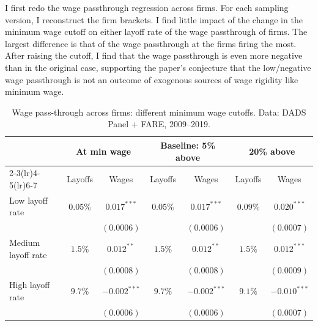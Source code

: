 I first redo the wage passthrough regression across firms. For each sampling version, I reconstruct the firm brackets. I find little impact of the change in the minimum wage cutoff on either layoff rate of the wage passthrough of firms. The largest difference is that of the wage passthrough at the firms firing the most. After raising the cutoff, I find that the wage passthrough is even more negative than in the original case, supporting the paper's conjecture that the low/negative wage passthrough is not an outcome of exogenous sources of wage rigidity like minimum wage.
\begin{table}[h!]
  \centering
  \begin{tabular}{lcccccc}
    \toprule
    & \multicolumn{2}{c}{At min wage} & \multicolumn{2}{c}{Baseline: 5\% above} & \multicolumn{2}{c}{20\% above}\\
    \cmidrule(lr){2-3}\cmidrule(lr){4-5}\cmidrule(lr){6-7}
    & Layoffs & Wages & Layoffs & Wages & Layoffs & Wages \\
    \midrule
    \hline
    Low layoff rate    & $0.05\%$  &  $0.017^{***}$  &  $0.05\%$    &  $0.017^{***}$     &  $0.09\%$    &  $0.020^{***}$ \\
                       &           &  $(0.0006)$     &              &  $(0.0006)$        &              &  $(0.0007)$ \\
    Medium layoff rate & $1.5\%$   &  $0.012^{**}$   & $1.5\%$      &  $0.012^{**}$      &  $1.5\%$     &   $0.012^{***}$\\
                       &           &  $(0.0008)$     &              &   $(0.0008)$       &              &   $(0.0009)$\\
    High layoff rate   & $9.7\%$   &  $-0.002^{***}$ & $9.7\%$      &  $-0.002^{***}$    &  $9.1\%$     &   $-0.010^{***}$\\
                       &           &  $(0.0006)$     &              &  $(0.0006)$        &              &   $(0.0007)$\\
    \hline
  \end{tabular}
  \caption{Wage pass-through across firms: different minimum wage cutoffs. Data: DADS Panel + FARE, 2009–2019.}
  \label{tab:minwage_control_acrossfirms}
\end{table}

